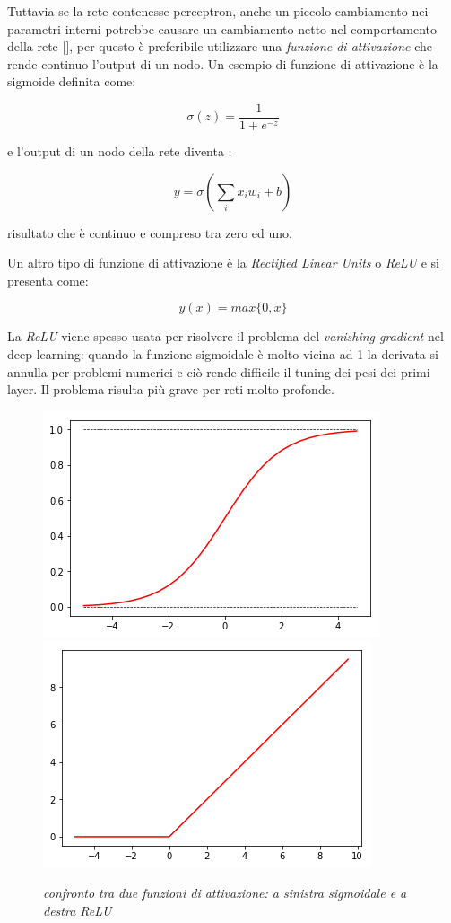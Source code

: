 \documentclass[12pt,a4paper]{report}
\begin{document}
Tuttavia se la rete contenesse perceptron, anche un piccolo cambiamento nei parametri interni potrebbe causare un cambiamento netto nel comportamento della rete [\cite{neural-net-nielsen}], per questo è preferibile utilizzare una \textit{funzione di attivazione} che rende continuo l'output di un nodo.
Un esempio di funzione di attivazione è la sigmoide definita come:

\begin{equation} \label{sigma}
 \sigma(z) = \frac{1}{1+e^{-z}} 
\end{equation}

e l'output di un nodo della rete diventa :

\begin{equation} \label{z}
  y = \sigma(\sum_{i}{x_{i}w_{i}} + b)
\end{equation}

risultato che è continuo e compreso tra zero ed uno.

Un altro tipo di funzione di attivazione è la \textit{Rectified Linear Units} o \textit{ReLU} e si presenta come:

\begin{equation}
 y(x) = max \{0,x\} 
\end{equation}

La \textit{ReLU} viene spesso usata per risolvere il problema del \textit{vanishing gradient} nel deep learning: quando la funzione sigmoidale è molto vicina ad 1 la derivata si annulla per problemi numerici e ciò rende difficile il tuning dei pesi dei primi layer. Il problema risulta più grave per reti molto profonde.

\begin{figure}[H]
 \centering
 \includegraphics[scale = 0.5]{images/sigmoide.png}
 \includegraphics[scale = 0.5]{images/relu.png}
 \caption{\textit{confronto tra due funzioni di attivazione: a sinistra sigmoidale e a destra ReLU}}
 \label{sigmarelu}
\end{figure}
\end{document}
